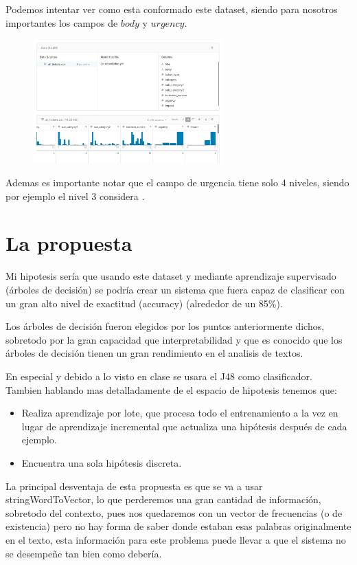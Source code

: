 \documentclass[12pt, fleqn]{report}                             %
\newcommand \Quote              {\qq}                           %
\theoremstyle{break}                                            %
\begin{document}
        Podemos intentar ver como esta conformado este dataset, siendo para nosotros importantes los campos de $body$ y $urgency$.
        \begin{figure}[h!]
            \centering
            \includegraphics[width=0.65\textwidth]{x2}
        \end{figure}

        Ademas es importante notar que el campo de urgencia tiene solo 4 niveles, siendo por ejemplo el nivel 3 considera \Quote{low}.

    \chapter{La propuesta}
        Mi hipotesis sería que usando este dataset y 
        mediante aprendizaje supervisado (árboles de decisión) se podría crear un sistema que fuera capaz de clasificar con
        un gran alto nivel de exactitud (accuracy) (alrededor de un 85\%).

        Los árboles de decisión fueron elegidos por los puntos anteriormente dichos, sobretodo por la gran capacidad que interpretabilidad
        y que es conocido que los árboles de decisión tienen un gran rendimiento en el analisis de textos.

        En especial y debido a lo visto en clase se usara el J48 como clasificador.
        Tambien hablando mas detalladamente de el espacio de hipotesis tenemos que:
        \begin{itemize}
            \item Realiza aprendizaje por lote, que procesa todo el entrenamiento
            a la vez en lugar de aprendizaje incremental
            que actualiza una hipótesis después de cada ejemplo.
            \item Encuentra una sola hipótesis discreta.
        \end{itemize}

        La principal desventaja de esta propuesta es que se va a usar stringWordToVector, lo que perderemos una gran cantidad
        de información, sobretodo del contexto, pues nos quedaremos con un vector de frecuencias (o de existencia)
        pero no hay forma de saber donde estaban esas palabras originalmente en el texto, esta información para este
        problema puede llevar a que el sistema no se desempeñe tan bien como debería.
\end{document}
